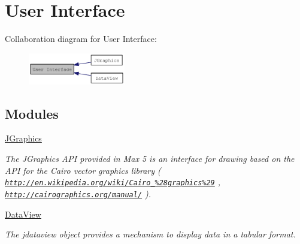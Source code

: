 \hypertarget{group__ui}{
\section{User Interface}
\label{group__ui}
}


Collaboration diagram for User Interface:\nopagebreak
\begin{figure}[H]
\begin{center}
\leavevmode
\includegraphics[width=120pt]{group__ui}
\end{center}
\end{figure}
\subsection*{Modules}
\begin{DoxyCompactItemize}
\item 
\hyperlink{group__jgraphics}{JGraphics}


\begin{DoxyCompactList}\small\item\em The JGraphics API provided in Max 5 is an interface for drawing based on the API for the Cairo vector graphics library ( \href{http://en.wikipedia.org/wiki/Cairo_%28graphics%29}{\tt http://en.wikipedia.org/wiki/Cairo\_\-\%28graphics\%29} , \href{http://cairographics.org/manual/}{\tt http://cairographics.org/manual/} ). \item\end{DoxyCompactList}\item 
\hyperlink{group__jdataview}{DataView}


\begin{DoxyCompactList}\small\item\em The jdataview object provides a mechanism to display data in a tabular format. \item\end{DoxyCompactList}\end{DoxyCompactItemize}

